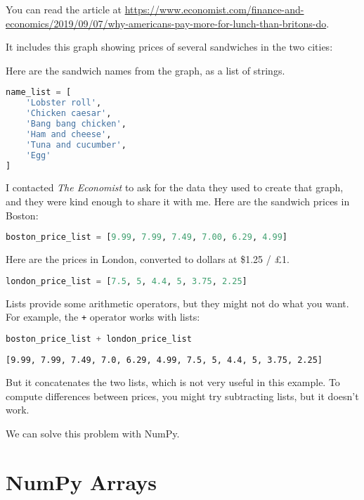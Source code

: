 You can read the article at
\url{https://www.economist.com/finance-and-economics/2019/09/07/why-americans-pay-more-for-lunch-than-britons-do}.

It includes this graph showing prices of several sandwiches in the two
cities:

Here are the sandwich names from the graph, as a list of strings.

\begin{lstlisting}[language=Python,style=source]
name_list = [
    'Lobster roll',
    'Chicken caesar',
    'Bang bang chicken',
    'Ham and cheese',
    'Tuna and cucumber',
    'Egg'
]
\end{lstlisting}

I contacted \emph{The Economist} to ask for the data they used to create
that graph, and they were kind enough to share it with me. Here are the
sandwich prices in Boston:

\begin{lstlisting}[language=Python,style=source]
boston_price_list = [9.99, 7.99, 7.49, 7.00, 6.29, 4.99]
\end{lstlisting}

Here are the prices in London, converted to dollars at \$1.25 / £1.

\begin{lstlisting}[language=Python,style=source]
london_price_list = [7.5, 5, 4.4, 5, 3.75, 2.25]
\end{lstlisting}

Lists provide some arithmetic operators, but they might not do what you
want. For example, the \passthrough{\lstinline!+!} operator works with
lists:

\begin{lstlisting}[language=Python,style=source]
boston_price_list + london_price_list
\end{lstlisting}

\begin{lstlisting}[style=output]
[9.99, 7.99, 7.49, 7.0, 6.29, 4.99, 7.5, 5, 4.4, 5, 3.75, 2.25]
\end{lstlisting}

But it concatenates the two lists, which is not very useful in this
example. To compute differences between prices, you might try
subtracting lists, but it doesn't work.

We can solve this problem with NumPy.

\section{NumPy Arrays}\label{numpy-arrays}

